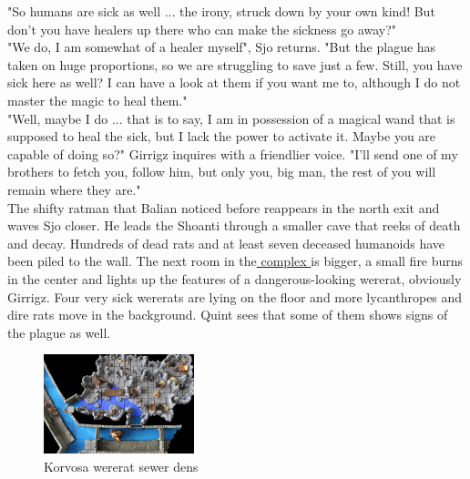 "So humans are sick as well ... the irony, struck down by your own kind! But don't you have healers up there who can make the sickness go away?"\\

"We do, I am somewhat of a healer myself", Sjo returns. "But the plague has taken on huge proportions, so we are struggling to save just a few. Still, you have sick here as well? I can have a look at them if you want me to, although I do not master the magic to heal them."\\

"Well, maybe I do ... that is to say, I am in possession of a magical wand that is supposed to heal the sick, but I lack the power to activate it. Maybe you are capable of doing so?" Girrigz inquires with a friendlier voice. "I'll send one of my brothers to fetch you, follow him, but only you, big man, the rest of you will remain where they are."\\

The shifty ratman that Balian noticed before reappears in the north exit and waves Sjo closer. He leads the Shoanti through a smaller cave that reeks of death and decay. Hundreds of dead rats and at least seven deceased humanoids have been piled to the wall. The next room in the\hyperref[fig:Korvosa-wererat-sewer-dens-503381693]{ complex } is bigger, a small fire burns in the center and lights up the features of a dangerous-looking wererat, obviously Girrigz. Four very sick wererats are lying on the floor and more lycanthropes and dire rats move in the background. Quint sees that some of them shows signs of the plague as well. \\

\begin{figure}[h]
	\centering
	\includegraphics[width=0.39\textwidth]{images/Korvosa-wererat-sewer-dens-503381693.jpg}
	\caption{Korvosa wererat sewer dens}
	\label{fig:Korvosa-wererat-sewer-dens-503381693}
\end{figure}

